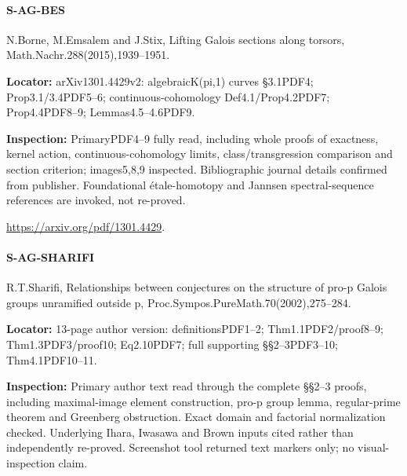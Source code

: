 \documentclass[11pt,a4paper]{article}
\begin{document}
\paragraph{S-AG-BES} N.\allowbreak{}Borne, M.\allowbreak{}Emsalem and J.\allowbreak{}Stix, Lifting Galois sections along torsors, Math.\allowbreak{}Nachr.\allowbreak{}288(2015),1939–\allowbreak{}1951.

\textbf{Locator:} arXiv1301.\allowbreak{}4429v2:\allowbreak{} algebraicK(pi,1) curves §3.\allowbreak{}1PDF4; Prop3.\allowbreak{}1/\allowbreak{}3.\allowbreak{}4PDF5–\allowbreak{}6; continuous-cohomology Def4.\allowbreak{}1/\allowbreak{}Prop4.\allowbreak{}2PDF7; Prop4.\allowbreak{}4PDF8–\allowbreak{}9; Lemmas4.\allowbreak{}5–\allowbreak{}4.\allowbreak{}6PDF9.

\textbf{Inspection:} PrimaryPDF4–\allowbreak{}9 fully read, including whole proofs of exactness, kernel action, continuous-cohomology limits, class/\allowbreak{}transgression comparison and section criterion; images5,8,9 inspected.\allowbreak{} Bibliographic journal details confirmed from publisher.\allowbreak{} Foundational étale-homotopy and Jannsen spectral-sequence references are invoked, not re-proved.\allowbreak{}

\url{https://arxiv.org/pdf/1301.4429}.

\paragraph{S-AG-SHARIFI} R.\allowbreak{}T.\allowbreak{}Sharifi, Relationships between conjectures on the structure of pro-p Galois groups unramified outside p, Proc.\allowbreak{}Sympos.\allowbreak{}PureMath.\allowbreak{}70(2002),275–\allowbreak{}284.

\textbf{Locator:} 13-page author version:\allowbreak{} definitionsPDF1–\allowbreak{}2; Thm1.\allowbreak{}1PDF2/\allowbreak{}proof8–\allowbreak{}9; Thm1.\allowbreak{}3PDF3/\allowbreak{}proof10; Eq2.\allowbreak{}10PDF7; full supporting §§2–\allowbreak{}3PDF3–\allowbreak{}10; Thm4.\allowbreak{}1PDF10–\allowbreak{}11.

\textbf{Inspection:} Primary author text read through the complete §§2–\allowbreak{}3 proofs, including maximal-image element construction, pro-p group lemma, regular-prime theorem and Greenberg obstruction.\allowbreak{} Exact domain and factorial normalization checked.\allowbreak{} Underlying Ihara, Iwasawa and Brown inputs cited rather than independently re-proved.\allowbreak{} Screenshot tool returned text markers only; no visual-inspection claim.\allowbreak{}
\end{document}
